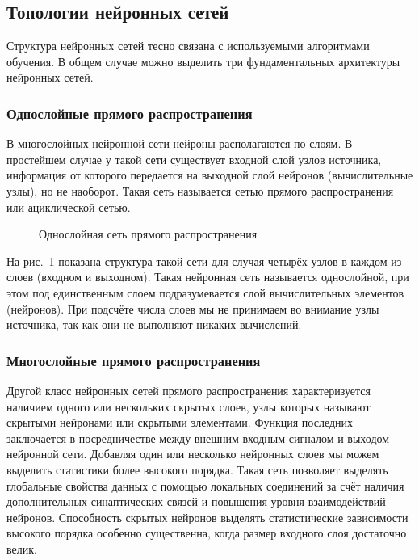 \subsection{Топологии нейронных сетей}

Структура нейронных сетей тесно связана с используемыми алгоритмами обучения.
В общем случае можно выделить три фундаментальных архитектуры нейронных сетей.

\subsubsection{Однослойные прямого распространения}

В многослойных нейронной сети нейроны располагаются по слоям.
В простейшем случае у такой сети существует входной слой узлов источника, информация от которого передается на выходной слой нейронов (вычислительные узлы), но не наоборот. 
Такая сеть называется сетью прямого распространения или ациклической сетью.
\begin{figure}[h]
\caption{Однослойная сеть прямого распространения}
\label{ris:OneLayer}
\end{figure}

На рис.~\ref{ris:OneLayer} показана структура такой сети для случая четырёх узлов в каждом из слоев (входном и выходном).
Такая нейронная сеть называется однослойной, при этом под единственным слоем подразумевается слой вычислительных элементов (нейронов).
При подсчёте числа слоев мы не принимаем во внимание узлы источника, так как они не выполняют никаких вычислений.\cite{NejronnyeSeti}

\subsubsection{Многослойные прямого распространения}

Другой класс нейронных сетей прямого распространения характеризуется наличием одного или нескольких скрытых слоев, узлы которых называют скрытыми нейронами или скрытыми элементами.
Функция последних заключается в посредничестве между внешним входным сигналом и выходом нейронной сети.
Добавляя один или несколько нейронных слоев мы можем выделить статистики более высокого порядка.
Такая сеть позволяет выделять глобальные свойства данных с помощью локальных соединений за счёт наличия дополнительных синаптических связей и повышения уровня взаимодействий нейронов.
Способность скрытых нейронов выделять статистические зависимости высокого порядка особенно существенна, когда размер входного слоя достаточно велик.

